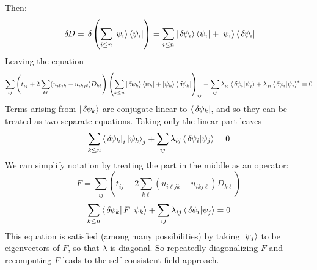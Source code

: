 \documentclass[a4paper,11pt]{article}
\newcommand{\9}{\,\,\,\,\,\,\,\,\,}
\newcommand{\ichg}{\,\delta\hspace{-0.3mm}}
\begin{document}
Then:
$$\ichg D = \ichg\left(\sum_{i\le n}\ket{\psi_i}\bra{\psi_i}\right) = \sum_{i\le n}\ket{\ichg\psi_i}\bra{\psi_i}+\ket{\psi_i}\bra{\ichg\psi_i}$$
Leaving the equation
$$\sum_{ij}\left(t_{ij} + 2\sum_{k\ell}(u_{i\ell jk}-u_{ikj\ell}) D_{k\ell}\right)\left(\sum_{k\le n}\ket{\ichg\psi_k}\bra{\psi_k}+\ket{\psi_k}\bra{\ichg\psi_k}\right)_{ij}  + \sum_{ij}\lambda_{ij}\braket{\ichg\psi_i|\psi_j}+\lambda_{ji}\braket{\ichg\psi_i|\psi_j}^* = 0$$
Terms arising from $\ket{\ichg\psi_k}$ are conjugate-linear to $\bra{\ichg\psi_k}$, and so they can be treated as two separate equations. Taking only the linear part leaves
$$\sum_{k\le n}\bra{\ichg\psi_k}_i\ket{\psi_k}_{j}  + \sum_{ij}\lambda_{ij}\braket{\ichg\psi_i|\psi_j} = 0$$
We can simplify notation by treating the part in the middle as an operator:
$$F = \sum_{ij}\left(t_{ij} + 2\sum_{k\ell}(u_{i\ell jk}-u_{ikj\ell}) D_{k\ell}\right)$$
$$\sum_{k\le n}\bra{\ichg\psi_k}F\ket{\psi_k}  + \sum_{ij}\lambda_{ij}\braket{\ichg\psi_i|\psi_j} = 0$$
This equation is satisfied (among many possibilities) by taking $\ket{\psi_j}$ to be eigenvectors of $F$, so that $\lambda$ is diagonal. So repeatedly diagonalizing $F$ and recomputing $F$ leads to the self-consistent field approach.
\end{document}
